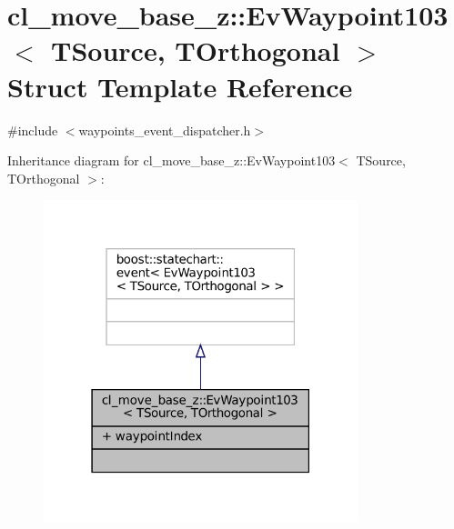 \hypertarget{structcl__move__base__z_1_1EvWaypoint103}{}\section{cl\+\_\+move\+\_\+base\+\_\+z\+:\+:Ev\+Waypoint103$<$ T\+Source, T\+Orthogonal $>$ Struct Template Reference}
\label{structcl__move__base__z_1_1EvWaypoint103}


{\ttfamily \#include $<$waypoints\+\_\+event\+\_\+dispatcher.\+h$>$}



Inheritance diagram for cl\+\_\+move\+\_\+base\+\_\+z\+:\+:Ev\+Waypoint103$<$ T\+Source, T\+Orthogonal $>$\+:
\nopagebreak
\begin{figure}[H]
\begin{center}
\leavevmode
\includegraphics[width=259pt]{structcl__move__base__z_1_1EvWaypoint103__inherit__graph}
\end{center}
\end{figure}


